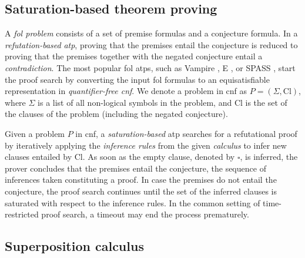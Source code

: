 

\subsection{Saturation-based theorem proving}

A \emph{\acrfull{fol} problem} consists of a set of premise formulas and a conjecture formula.
In a \emph{refutation-based} \emph{\acrfull{atp}},
proving that the premises entail the conjecture
is reduced to proving that the premises together with the negated conjecture entail a \emph{contradiction}.
The most popular \gls{fol} \glspl{atp}, such as Vampire \cite{10.1007/978-3-642-39799-8_1}, E \cite{10.1007/978-3-030-29436-6_29}, or SPASS \cite{},
start the proof search by converting the input \gls{fol} formulas to an equisatisfiable representation in \emph{quantifier-free \gls{cnf}}.\cite{Harrison2009}
We denote a problem in \gls{cnf} as $P = (\Sigma, \mathrm{Cl})$,
where $\Sigma$ is a list of all non-logical symbols in the problem,
and $\mathrm{Cl}$ is the set of the clauses of the problem (including the negated conjecture).

Given a problem $P$ in \gls{cnf},
a \emph{saturation-based} \gls{atp} searches for a refutational proof
by iteratively applying the \emph{inference rules} from the given \emph{calculus}
to infer new clauses entailed by $\mathrm{Cl}$.
As soon as the empty clause, denoted by $\square$, is inferred,
the prover concludes that the premises entail the conjecture,
the sequence of inferences taken constituting a proof.
In case the premises do not entail the conjecture,
the proof search continues until
the set of the inferred clauses is saturated with respect to the inference rules.
In the common setting of time-restricted proof search, a timeout may end the process prematurely.



\subsection{Superposition calculus}

